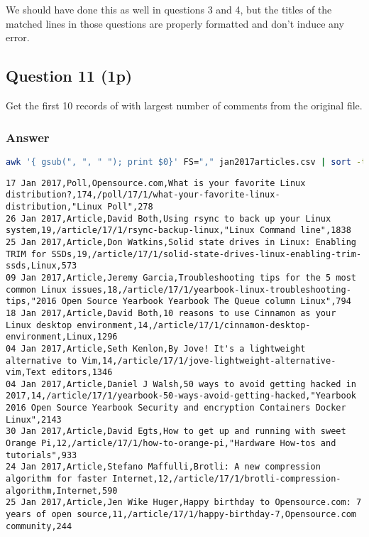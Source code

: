 We should have done this as well in questions 3 and 4, but the titles of the matched lines in those questions are properly formatted and don’t induce any error.

\subsection*{Question 11 (1p)}
Get the first 10 records of  with largest number of comments from the original  file.

\subsubsection*{Answer}
\begin{lstlisting}[language=bash]
awk '{ gsub(", ", " "); print $0}' FS="," jan2017articles.csv | sort -t',' -k5 -n -r 2>/dev/null | head
\end{lstlisting}

\begin{lstlisting}[style=output]
17 Jan 2017,Poll,Opensource.com,What is your favorite Linux distribution?,174,/poll/17/1/what-your-favorite-linux-distribution,"Linux Poll",278
26 Jan 2017,Article,David Both,Using rsync to back up your Linux system,19,/article/17/1/rsync-backup-linux,"Linux Command line",1838
25 Jan 2017,Article,Don Watkins,Solid state drives in Linux: Enabling TRIM for SSDs,19,/article/17/1/solid-state-drives-linux-enabling-trim-ssds,Linux,573
09 Jan 2017,Article,Jeremy Garcia,Troubleshooting tips for the 5 most common Linux issues,18,/article/17/1/yearbook-linux-troubleshooting-tips,"2016 Open Source Yearbook Yearbook The Queue column Linux",794
18 Jan 2017,Article,David Both,10 reasons to use Cinnamon as your Linux desktop environment,14,/article/17/1/cinnamon-desktop-environment,Linux,1296
04 Jan 2017,Article,Seth Kenlon,By Jove! It's a lightweight alternative to Vim,14,/article/17/1/jove-lightweight-alternative-vim,Text editors,1346
04 Jan 2017,Article,Daniel J Walsh,50 ways to avoid getting hacked in 2017,14,/article/17/1/yearbook-50-ways-avoid-getting-hacked,"Yearbook 2016 Open Source Yearbook Security and encryption Containers Docker Linux",2143
30 Jan 2017,Article,David Egts,How to get up and running with sweet Orange Pi,12,/article/17/1/how-to-orange-pi,"Hardware How-tos and tutorials",933
24 Jan 2017,Article,Stefano Maffulli,Brotli: A new compression algorithm for faster Internet,12,/article/17/1/brotli-compression-algorithm,Internet,590
25 Jan 2017,Article,Jen Wike Huger,Happy birthday to Opensource.com: 7 years of open source,11,/article/17/1/happy-birthday-7,Opensource.com community,244
\end{lstlisting}

